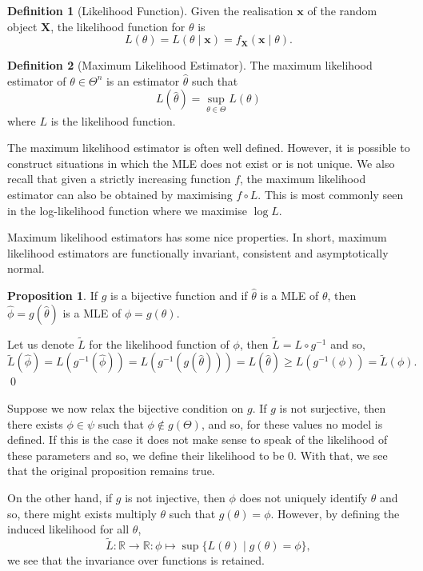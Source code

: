 \documentclass[
]{article}
\theoremstyle{definition}
\newtheorem{prop}{Proposition}
\theoremstyle{definition}
\newtheorem{definition}{Definition}[section]
\begin{document}
\begin{definition}[Likelihood Function]
  Given the realisation \(\mathbf{x}\) of the random object \(\mathbf{X}\), the 
  likelihood function for \(\theta\) is 
  \[L(\theta) = L(\theta \mid \mathbf{x}) = f_\mathbf{X}(\mathbf{x} \mid \theta).\]
\end{definition}

\begin{definition}[Maximum Likelihood Estimator]
  The maximum likelihood estimator of \(\theta \in \Theta^n\) is an estimator 
  \(\hat{\theta}\) such that 
  \[L(\hat{\theta}) = \sup_{\theta \in \Theta} L(\theta)\]
  where \(L\) is the likelihood function.
\end{definition}

The maximum likelihood estimator is often well defined. However, it is
possible to construct situations in which the MLE does not exist or is
not unique. We also recall that given a strictly increasing function
\(f\), the maximum likelihood estimator can also be obtained by
maximising \(f \circ L\). This is most commonly seen in the
log-likelihood function where we maximise \(\log L\).

Maximum likelihood estimators has some nice properties. In short,
maximum likelihood estimators are functionally invariant, consistent and
asymptotically normal.

\begin{prop}
  If \(g\) is a bijective function and if \(\hat{\theta}\) is a MLE of \(\theta\), 
  then \(\hat{\phi} = g(\hat{\theta})\) is a MLE of \(\phi = g(\theta)\).
\end{prop}
\proof

Let us denote \(\tilde{L}\) for the likelihood function of \(\phi\),
then \(\tilde{L} = L \circ g^{-1}\) and so,
\[\tilde{L}(\hat{\phi}) = L(g^{-1}(\hat{\phi})) = L(g^{-1}(g(\hat{\theta})))
    = L(\hat{\theta}) \ge L(g^{-1}(\phi)) = \tilde{L}(\phi).\] \qed

Suppose we now relax the bijective condition on \(g\). If \(g\) is not
surjective, then there exists \(\phi \in \psi\) such that
\(\phi \notin g(\Theta)\), and so, for these values no model is defined.
If this is the case it does not make sense to speak of the likelihood of
these parameters and so, we define their likelihood to be 0. With that,
we see that the original proposition remains true.

On the other hand, if \(g\) is not injective, then \(\phi\) does not
uniquely identify \(\theta\) and so, there might exists multiply
\(\theta\) such that \(g(\theta) = \phi\). However, by defining the
induced likelihood for all \(\theta\),
\[\tilde{L} : \mathbb{R} \to \mathbb{R} : \phi \mapsto \sup\{L(\theta) \mid g(\theta) = \phi\},\]
we see that the invariance over functions is retained.
\end{document}
